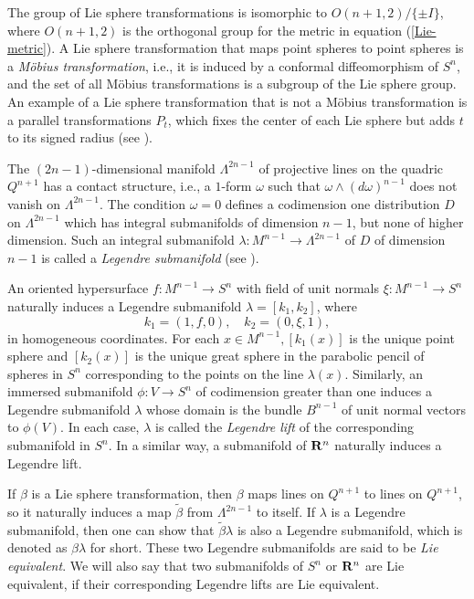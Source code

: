 \documentclass[12pt]{article}
\begin{document}
The group of Lie sphere transformations is
isomorphic to $O(n+1,2)/ \{ \pm I \}$, where $O(n+1,2)$
is the orthogonal group for the metric in equation (\ref{Lie-metric}).
A Lie sphere transformation that maps point spheres to point spheres is a {\em M\"{o}bius transformation}, i.e.,
it is induced by a conformal diffeomorphism of $S^n$, and the set of all M\"{o}bius transformations is a subgroup of the Lie sphere group.  
An example of a Lie sphere transformation that is not
a M\"{o}bius transformation is a parallel transformations $P_t$, which fixes the center of each Lie
sphere but adds $t$ to its signed radius (see \cite[pp. 25--49]{Cec1}). 


The $(2n-1)$-dimensional manifold $\Lambda^{2n-1}$ of projective lines on the quadric $Q^{n+1}$ has a 
contact structure, i.e., a
$1$-form $\omega$ such that $\omega \wedge (d\omega)^{n-1}$ does not vanish on $\Lambda^{2n-1}$.  The condition $\omega = 0$ defines a codimension one distribution $D$ on $\Lambda^{2n-1}$ which has 
integral submanifolds
of dimension $n-1$, but none of higher dimension.  Such an integral  submanifold 
$\lambda: M^{n-1} \rightarrow \Lambda^{2n-1}$ of $D$ of dimension $n-1$ is called a 
{\em Legendre submanifold} (see \cite[pp. 51--64]{Cec1}).

An oriented hypersurface $f:M^{n-1} \rightarrow S^n$ with field of unit
normals $\xi :M^{n-1} \rightarrow S^n$ naturally induces
a Legendre submanifold $\lambda = [k_1, k_2]$, where 
\begin{equation}
k_1 = (1,f,0), \quad k_2 = (0,\xi ,1),
\end{equation}
in homogeneous coordinates.
For each $x \in M^{n-1}, [k_1(x)]$ is the unique point sphere and
$[k_2 (x)]$ is the unique great sphere in the parabolic pencil of spheres in $S^n$ corresponding to 
the points on the line $\lambda (x)$.
Similarly, an immersed submanifold $\phi :V \rightarrow S^n$ of codimension 
greater than one induces a Legendre submanifold $\lambda$
whose domain is the bundle $B^{n-1}$ of unit normal
vectors to $\phi (V)$.  In each case, $\lambda$ is called the {\em Legendre lift} of the 
corresponding submanifold in $S^n$.
In a similar way, a submanifold of  ${\bf R}^n$ naturally induces a Legendre lift.


If $\beta$  is a Lie sphere transformation, then $\beta$ maps lines on
$Q^{n+1}$ to lines on $Q^{n+1}$, so it naturally
induces a map $\widetilde{\beta }$ from 
$\Lambda ^{2n-1}$ to itself.  If $\lambda$ is a
Legendre submanifold, then one can show that $\widetilde{\beta}\lambda$
is also a Legendre submanifold, which is denoted as
$\beta \lambda$ for short.  These two Legendre
submanifolds are said to be {\em Lie equivalent}.
We will also say that two submanifolds of $S^n$ or ${\bf R}^n$
are Lie equivalent, if their corresponding Legendre lifts
are Lie equivalent. 
\end{document}
